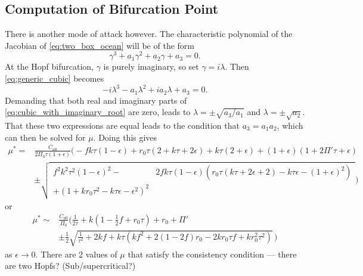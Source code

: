 \subsection{Computation of Bifurcation Point}
There is another mode of attack however. The characteristic polynomial of the Jacobian of \cref{eq:two_box_ocean} will be of the form
\begin{equation}
  \label{eq:generic_cubic}
  \gamma^3 + a_1 \gamma^2 + a_2 \gamma + a_3 = 0.
\end{equation}
At the Hopf bifurcation, $\gamma$ is purely imaginary, so set $\gamma = i\lambda$. Then \cref{eq:generic_cubic} becomes
\begin{equation}
  \label{eq:cubic_with_imaginary_root}
  -i\lambda^3 - a_1 \lambda^2 + i a_2 \lambda + a_3 = 0. 
\end{equation}
Demanding that both real and imaginary parts of \cref{eq:cubic_with_imaginary_root} are zero, leads to $\lambda = \pm \sqrt{a_3/a_1}$ and $\lambda = \pm \sqrt{a_2}$. That these two expressions
are equal leads to the condition that $a_3 = a_1a_2$, which can then be solved for $\mu$. Doing this gives
\begin{equation}
  \label{eq:mu_two_box}
  \begin{split}
  \mu^* = &\frac{C_{a0}}{2 \Pi_0 \tau  (1+\epsilon)}
  \Biggl(
  -f k \tau  (1-\epsilon)+r_0 \tau  (2 + k \tau +2 \epsilon)+k \tau  (2+\epsilon)+(1+\epsilon) (1+2 \Pi' \tau +\epsilon)\\
  &\pm\sqrt{
    \begin{split}
    f^2 k^2 \tau ^2 (1-\epsilon)^2-&2 f k \tau  (1-\epsilon) \left(r_0 \tau  (k \tau +2 \epsilon +2)-k \tau  \epsilon -(1+\epsilon)^2\right)\\+
    \left(1+k r_0 \tau ^2-k \tau  \epsilon -\epsilon ^2\right)^2
  \end{split}}
  \Biggr)
  \end{split}
\end{equation}
or
\begin{equation}
  \label{eq:mu_two_box_zero_eps}
  \begin{split}
  \mu^* \sim &\frac{C_{a0}}{\Pi_0}\Biggl(
    \frac{1}{2\tau} + k(1 - \frac{1}{2}f + r_0 \tau) + r_0 + \Pi'\\
  &\pm\frac{1}{2}\sqrt{\frac{1}{\tau^2} + 2kf + k\tau(kf^2 + 2 (1 - 2f)r_0  - 2 k r_0\tau f  + k r_0^2 \tau^2)}\,\Biggr)
\end{split}
\end{equation}
as $\epsilon \rightarrow 0$.
There are 2 values of $\mu$ that satisfy the consistency condition --- there are two Hopfs? (Sub/supercritical?)
